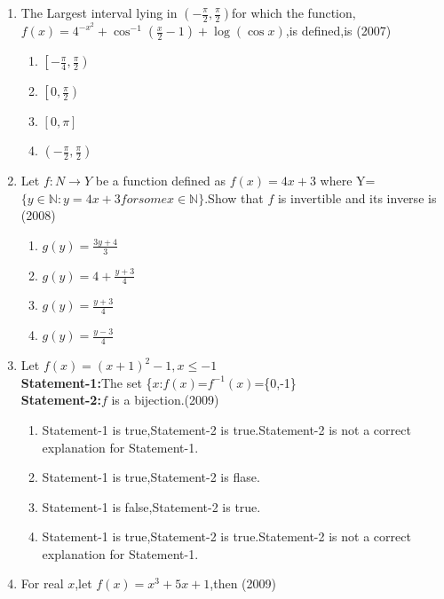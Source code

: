 \documentclass[journal,12pt,twocolumn]{IEEEtran}
\theoremstyle{remark}
\begin{document}
\begin{enumerate}[start=4]
     \item The Largest interval lying in $\left(-\frac{\pi}{2},\frac{\pi}{2}\right)$for which the function,
	     $f(x)=4^{-x^{2}}+\cos^{-1}\left(\frac{x}{2}-1\right)+\log(\cos{x})$,is defined,is \hfill(2007)
	     \begin{enumerate}
		     \item $\left[-\frac{\pi}{4},\frac{\pi}{2}\right)$ \\
		     \item $\left[0,\frac{\pi}{2}\right)$ \\
		     \item $[0,\pi]$ \\
		     \item $\left(-\frac{\pi}{2},\frac{\pi}{2}\right)$
	     \end{enumerate}
     \item Let $f:N\to Y$ be a function defined as $f(x)=4x+3$ where Y=$\{y\in \mathbb{N}:y=4x+3 for some x\in \mathbb{N}\}$.Show that $f$ is invertible and its inverse is \hfill(2008)
	     \begin{enumerate}
		     \item $g(y)=\frac{3y+4}{3}$ \\
		     \item $g(y)=4+\frac{y+3}{4}$ \\
		     \item $g(y)=\frac{y+3}{4}$ \\
		     \item $g(y)=\frac{y-3}{4}$
	     \end{enumerate}
     \item Let $f(x)=(x+1)^{2}-1,x\leq-1$\\
	     \textbf{Statement-1:}The set \{$x$:$f(x)$=$f^{-1}(x)$=\{0,-1\}\\
	     \textbf{Statement-2:}$f$ is a bijection.\hfill(2009)
	     \begin{enumerate}
		     \item Statement-1 is true,Statement-2 is true.Statement-2 is  not a correct explanation for Statement-1.
		     \item Statement-1 is true,Statement-2 is flase.
		     \item Statement-1 is false,Statement-2 is true.
		     \item Statement-1 is true,Statement-2 is true.Statement-2 is not a correct explanation for Statement-1.
	     \end{enumerate}
     \item For real $x$,let $f(x)=x^{3}+5x+1$,then \hfill(2009)

\end{enumerate}
\end{document}
